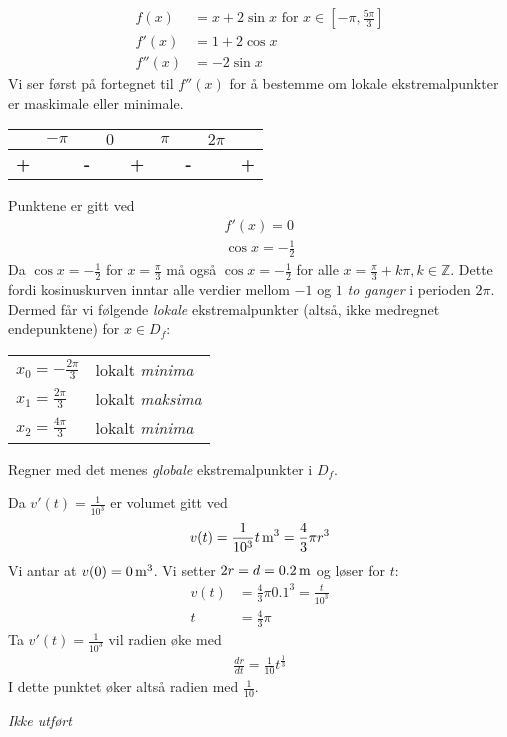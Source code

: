 \documentclass[a4paper,norsk,12pt]{article}
\begin{document}
\begin{align*}
  f(x) &= x+2\sin{x} \text{ for } x \in \left[-\pi, \frac{5\pi}{3}\right] \\
  f'(x) &= 1 + 2\cos{x} \\
  f''(x) &= -2\sin{x}
\end{align*}
Vi ser først på fortegnet til $f''(x)$ for å bestemme om lokale
ekstremalpunkter er maskimale eller minimale.
\begin{table}[h]
  \centering
\begin{tabular}{ccccccccc}
  & $-\pi$
  &
  & $0$
  &
  & $\pi$
  &
  & $2\pi$
  &
\\ \hline
    \textbf{\large{+}}
& & \textbf{\large{-}}
& & \textbf{\large{+}}
& & \textbf{\large{-}}
& & \textbf{\large{+}}
\end{tabular}
\end{table}

Punktene er gitt ved
\begin{align*}
  f'(x) = 0 \\
  \cos{x} = -\frac{1}{2}
\end{align*}
Da $\cos{x} = -\frac{1}{2}$ for $x=\frac{\pi}{3}$ må også
$\cos{x}=-\frac{1}{2}$ for alle $x = \frac{\pi}{3} + k\pi, k \in \mathbb{Z}$.
Dette fordi kosinuskurven inntar alle verdier mellom $-1$ og $1$ \textit{to
ganger} i perioden $2\pi$. Dermed får vi følgende \textit{lokale} ekstremalpunkter
(altså, ikke medregnet endepunktene) for $x \in D_f$:
\begin{table}[h]
  \centering
  \begin{tabular}{ll}
    $x_0 = -\frac{2\pi}{3}$ & lokalt \textit{minima} \\
    $x_1 =  \frac{2\pi}{3}$ & lokalt \textit{maksima} \\
    $x_2 =  \frac{4\pi}{3}$ & lokalt \textit{minima}
  \end{tabular}
\end{table}

Regner med det menes \textit{globale} ekstremalpunkter i $D_f$. 

Da $v'(t) = \frac{1}{10^3}$ er volumet gitt ved
\begin{align*}
  v(t) = \unit[\frac{1}{10^3}t]{m^3} = \frac{4}{3}\pi r^3
\end{align*}
Vi antar at $v(0) = \unit[0]{m^3}$. Vi setter $2r = d = \unit[0.2]{m}$ og løser
for $t$:
\begin{align*}
  v(t) &= \frac{4}{3}\pi 0.1^3 = \frac{t}{10^3} \\
  t &= \frac{4}{3}\pi
\end{align*}
Ta $v'(t) = \frac{1}{10^3}$ vil radien øke med
\begin{align*}
  \frac{dr}{dt} = \frac{1}{10}t^\frac{1}{3}
\end{align*}
I dette punktet øker altså radien med $\frac{1}{10}$.

\textit{Ikke utført}
\end{document}
